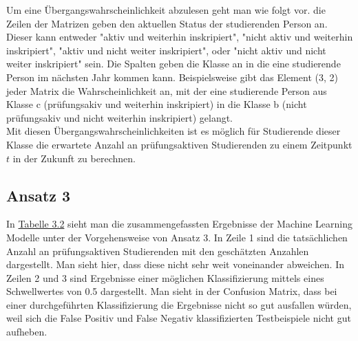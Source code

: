 Um eine \"Ubergangswahrscheinlichkeit abzulesen geht man wie folgt vor. die Zeilen der Matrizen geben den aktuellen Status der studierenden Person an. 
Dieser kann entweder "aktiv und weiterhin inskripiert", "nicht aktiv und weiterhin inskripiert", "aktiv und nicht weiter inskripiert", oder "nicht aktiv und nicht weiter inskripiert" sein.
Die Spalten geben die Klasse an in die eine studierende Person im n\"achsten Jahr kommen kann. Beispielsweise gibt das Element (3, 2) jeder Matrix die Wahrscheinlichkeit an,
mit der eine studierende Person aus Klasse c (pr\"ufungsakiv und weiterhin inskripiert) in die Klasse b (nicht pr\"ufungsakiv und nicht weiterhin inskripiert) gelangt.\\


Mit diesen \"Ubergangswahrscheinlichkeiten ist es m\"oglich f\"ur Studierende dieser Klasse die erwartete Anzahl an pr\"ufungsaktiven Studierenden 
zu einem Zeitpunkt $t$ in der Zukunft zu berechnen.

\subsection{Ansatz 3}

In \hyperref[tab:ergebnisA3P1]{Tabelle 3.2} sieht man die zusammengefassten Ergebnisse der  Machine Learning Modelle unter der Vorgehensweise von Ansatz 3. 
In Zeile 1 sind die tats\"achlichen Anzahl an pr\"ufungsaktiven Studierenden mit den gesch\"atzten Anzahlen dargestellt. Man sieht hier, dass diese nicht sehr weit voneinander abweichen.
In Zeilen 2 und 3 sind Ergebnisse einer m\"oglichen Klassifizierung mittels eines Schwellwertes von 0.5 dargestellt. Man sieht in der Confusion Matrix, dass bei einer 
durchgef\"uhrten Klassifizierung die Ergebnisse nicht so gut ausfallen w\"urden, weil sich die False Positiv und False Negativ klassifizierten Testbeispiele nicht gut aufheben. 

